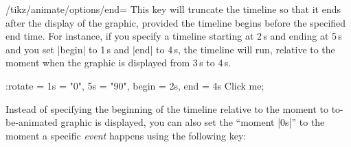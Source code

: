 \begin{key}{/tikz/animate/options/end=}
  This key will truncate the timeline so that it ends 
  after the display of the graphic, provided the timeline begins
  before the specified end time. For instance, if you specify a
  timeline starting at 2\,s and ending at 5\,s and you set |begin| to
  1\,s and |end| to 4\,s, the timeline will run, relative to the moment
  when the graphic is displayed from 3\,s to 4\,s.

\begin{codeexample}[]
\tikz \node [fill = green!50!black, text = white] 
    :rotate = { 1s = "0", 5s = "90", begin = 2s, end = 4s }
  {Click me};
\end{codeexample}
\end{key}

Instead of specifying the beginning of the timeline relative to the
moment to to-be-animated graphic is displayed, you can also set the
``moment |0s|'' to the moment a specific \emph{event} happens using
the following key:

